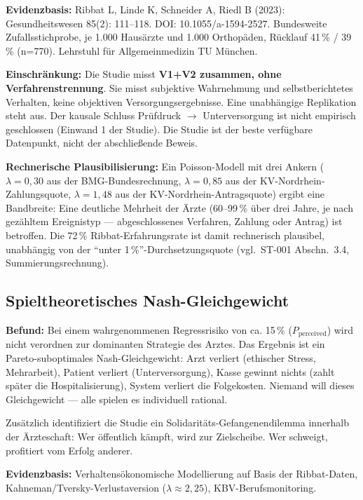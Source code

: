 \documentclass{umbruch-position}
\begin{document}
\textbf{Evidenzbasis:} Ribbat L, Linde K, Schneider A, Riedl B (2023): Gesundheitswesen 85(2): 111--118. DOI: 10.1055/a-1594-2527. Bundesweite Zufallsstichprobe, je 1.000 Haus\"arzte und 1.000 Orthop\"aden, R\"ucklauf 41\,\% / 39\,\% (n=770). Lehrstuhl f\"ur Allgemeinmedizin TU M\"unchen.

\textbf{Einschr\"ankung:} Die Studie misst \textbf{V1+V2 zusammen, ohne Verfahrenstrennung}. Sie misst subjektive Wahrnehmung und selbstberichtetes Verhalten, keine objektiven Versorgungsergebnisse. Eine unabh\"angige Replikation steht aus. Der kausale Schluss \glqq{}Pr\"ufdruck $\to$ Unterversorgung\grqq{} ist nicht empirisch geschlossen (Einwand 1 der Studie). Die Studie ist der beste verf\"ugbare Datenpunkt, nicht der abschlie\ss{}ende Beweis.

\textbf{Rechnerische Plausibilisierung:} Ein Poisson-Modell mit drei Ankern ($\lambda = 0{,}30$ aus der BMG-Bundesrechnung, $\lambda = 0{,}85$ aus der KV-Nordrhein-Zahlungsquote, $\lambda = 1{,}48$ aus der KV-Nordrhein-Antragsquote) ergibt eine Bandbreite: Eine deutliche Mehrheit der \"Arzte (60--99\,\% \"uber drei Jahre, je nach gez\"ahltem Ereignistyp --- abgeschlossenes Verfahren, Zahlung oder Antrag) ist betroffen. Die 72\,\% Ribbat-Erfahrungsrate ist damit rechnerisch plausibel, unabh\"angig von der ``unter 1\,\%''-Durchsetzungsquote (vgl.\ ST-001 Abschn.~3.4, Summierungsrechnung).

\subsection{Spieltheoretisches Nash-Gleichgewicht}

\textbf{Befund:} Bei einem wahrgenommenen Regressrisiko von ca. 15\,\% ($P_{\text{perceived}}$) wird \glqq{}nicht verordnen\grqq{} zur dominanten Strategie des Arztes. Das Ergebnis ist ein Pareto-suboptimales Nash-Gleichgewicht: Arzt verliert (ethischer Stress, Mehrarbeit), Patient verliert (Unterversorgung), Kasse gewinnt nichts (zahlt sp\"ater die Hospitalisierung), System verliert die Folgekosten. Niemand will dieses Gleichgewicht --- alle spielen es individuell rational.

Zus\"atzlich identifiziert die Studie ein Solidarit\"ats-Gefangenendilemma innerhalb der \"Arzteschaft: Wer \"offentlich k\"ampft, wird zur Zielscheibe. Wer schweigt, profitiert vom Erfolg anderer.

\textbf{Evidenzbasis:} Verhaltens\"okonomische Modellierung auf Basis der Ribbat-Daten, Kahneman/Tversky-Verlustaversion ($\lambda \approx 2{,}25$), KBV-Berufsmonitoring.
\end{document}
